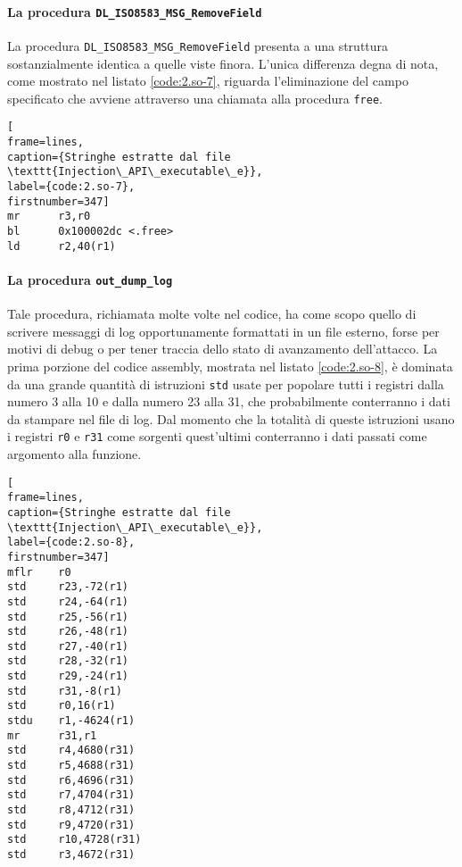 \documentclass[10pt,a4paper, titlepage]{report}
\begin{document}
\paragraph{La procedura \texttt{DL\_ISO8583\_MSG\_RemoveField}}

La procedura \texttt{DL\_ISO8583\_MSG\_RemoveField} presenta a una struttura sostanzialmente identica a quelle viste finora. L'unica differenza degna di nota, come mostrato nel listato \ref{code:2.so-7}, riguarda l'eliminazione del campo specificato che avviene attraverso una chiamata alla procedura \texttt{free}.

\begin{lstlisting}[
frame=lines, 
caption={Stringhe estratte dal file \texttt{Injection\_API\_executable\_e}}, 
label={code:2.so-7},
firstnumber=347]
mr      r3,r0
bl      0x100002dc <.free>
ld      r2,40(r1)
\end{lstlisting}

\paragraph{La procedura \texttt{out\_dump\_log}}

Tale procedura, richiamata molte volte nel codice, ha come scopo quello di scrivere messaggi di log opportunamente formattati in un file esterno, forse per motivi di debug o per tener traccia dello stato di avanzamento dell'attacco.
La prima porzione del codice assembly, mostrata nel listato \ref{code:2.so-8}, è dominata da una grande quantità di istruzioni \texttt{std} usate per popolare tutti i registri dalla numero 3 alla 10 e dalla numero 23 alla 31, che probabilmente conterranno i dati da stampare nel file di log.
Dal momento che la totalità di queste istruzioni usano i registri \texttt{r0} e \texttt{r31} come sorgenti quest'ultimi conterranno i dati passati come argomento alla funzione.

\begin{lstlisting}[
frame=lines, 
caption={Stringhe estratte dal file \texttt{Injection\_API\_executable\_e}}, 
label={code:2.so-8},
firstnumber=347]
mflr    r0
std     r23,-72(r1)
std     r24,-64(r1)
std     r25,-56(r1)
std     r26,-48(r1)
std     r27,-40(r1)
std     r28,-32(r1)
std     r29,-24(r1)
std     r31,-8(r1)
std     r0,16(r1)
stdu    r1,-4624(r1)
mr      r31,r1
std     r4,4680(r31)
std     r5,4688(r31)
std     r6,4696(r31)
std     r7,4704(r31)
std     r8,4712(r31)
std     r9,4720(r31)
std     r10,4728(r31)
std     r3,4672(r31)
\end{lstlisting}
\end{document}
